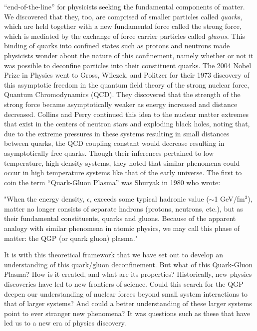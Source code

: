 ``end-of-the-line'' for physicists seeking the fundamental components of matter. We discovered that they, too, are comprised of smaller particles called \textit{quarks}, which are held together with a new fundamental force called the strong force, which is mediated by the exchange of force carrier particles called \textit{gluons.} This binding of quarks into confined states such as protons and neutrons made physicists wonder about the nature of this confinement, namely whether or not it was possible to deconfine particles into their constituent quarks. The 2004 Nobel Prize in Physics went to Gross, Wilczek\citep{PhysRevD.8.3633}, and Politzer\citep{PhysRevLett.30.1346} for their 1973 discovery of this asymptotic freedom in the quantum field theory of the strong nuclear force, Quantum Chromodynamics (QCD). They discovered that the strength of the strong force became asymptotically weaker as energy increased and distance decreased. Collins and Perry\citep{Collins:1974ky} continued this idea to the nuclear matter extremes that exist in the centers of neutron stars and exploding black holes, noting that, due to the extreme pressures in these systems resulting in small distances between quarks, the QCD coupling constant would decrease resulting in asymptotically free quarks. Though their inferences pertained to low temperature, high density systems, they noted that similar phenomena could occur in high temperature systems like that of the early universe. The first to coin the term ``Quark-Gluon Plasma'' was Shuryak in 1980 \citep{Shuryak:1980tp} who wrote: 

\begin{addmargin}[1.5em]{2em}
"When the energy density, $\epsilon$, exceeds some typical hadronic value ($\sim$1 GeV/fm$^{3}$), matter no longer consists of separate hadrons (protons, neutrons, etc.), but as their fundamental constituents, quarks and gluons. Because of the apparent analogy with similar phenomena in atomic physics, we may call this phase of matter: the QGP (or quark gluon) plasma."
\end{addmargin}
 
It is with this theoretical framework that we have set out to develop an understanding of this quark/gluon deconfinement. But what of this Quark-Gluon Plasma? How is it created, and what are its properties? Historically, new physics discoveries have led to new frontiers of science. Could this search for the QGP deepen our understanding of nuclear forces beyond small system interactions to that of larger systems? And could a better understanding of these larger systems point to ever stranger new phenomena? It was questions such as these that have led us to a new era of physics discovery.

